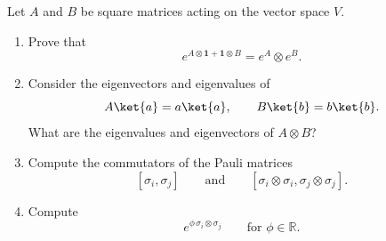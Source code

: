 \begin{Problem}
Let $A$ and $B$ be square matrices acting on the vector space $V$.

\begin{enumerate}
    \item[(a)] Prove that
    \[
    e^{A \otimes \mathbf{1} + \mathbf{1} \otimes B}
    =
    e^A \otimes e^B.
    \]

    \item[(b)] Consider the eigenvectors and eigenvalues of
    \[
    A\ket{a} = a\ket{a},
    \qquad
    B\ket{b} = b\ket{b}.
    \]
    What are the eigenvalues and eigenvectors of $A \otimes B$?

    \item[(c)] Compute the commutators of the Pauli matrices
    \[
    [\sigma_i,\sigma_j]
    \qquad \text{and} \qquad
    [\sigma_i \otimes \sigma_i,\sigma_j \otimes \sigma_j].
    \]

    \item[(d)] Compute
    \[
    e^{\phi\, \sigma_i \otimes \sigma_j}
    \qquad \text{for } \phi \in \mathbb{R}.
    \]
\end{enumerate}
\end{Problem}
